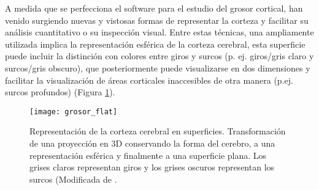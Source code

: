 A medida que se perfecciona el software para el estudio del grosor cortical, han venido surgiendo nuevas y vistosas formas de representar la corteza y facilitar su análisis cuantitativo o su inspección visual. Entre estas técnicas, una ampliamente utilizada implica la representación esférica de la corteza cerebral, esta superficie puede incluir la distinción con colores entre giros y surcos (p. ej. giros/gris claro y surcos/gris obscuro), que posteriormente puede visualizarse en dos dimensiones y facilitar la visualización de áreas corticales inaccesibles de otra manera (p.ej. surcos profundos) (Figura \ref{fig:grosor_flat}).

\begin{figure}[htb]
\begin{figg}
   \texttt{[image: grosor\_flat]}
   \caption{Representación de la corteza cerebral en superficies. Transformación de una proyección en 3D conservando la forma del cerebro, a una representación esférica y finalmente a una superficie plana. Los grises claros representan giros y los grises oscuros representan los surcos (Modificada de \cite{Woods_2009}.
}
 \label{fig:grosor_flat}
 \end{figg}
\end{figure}


